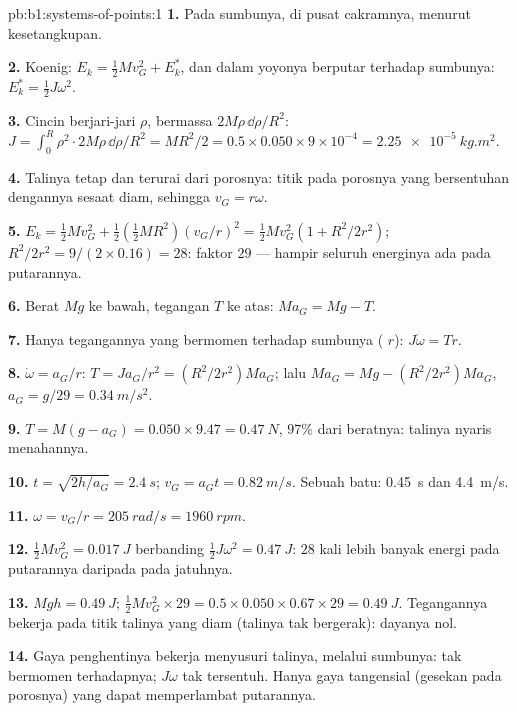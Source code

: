 \begin{solution}{pb:b1:systems-of-points:1}
\textbf{1.} Pada sumbunya, di pusat cakramnya, menurut kesetangkupan.

\textbf{2.} Koenig: $E_k = \tfrac12 Mv_G^2 + E_k^*$, dan dalam  yoyonya berputar terhadap sumbunya: $E_k^* = \tfrac12 J\omega^2$.

\textbf{3.} Cincin berjari-jari $\rho$, bermassa $2M\rho\,\dd\rho/R^2$: $J = \int_0^R
\rho^2\cdot 2M\rho\,\dd\rho/R^2 = MR^2/2 = 0.5 \times 0.050 \times 9\times10^{-4}
= \qty{2.25e-5}{kg.m^2}$.

\textbf{4.} Talinya tetap dan terurai dari porosnya: titik pada
porosnya yang bersentuhan dengannya sesaat diam, sehingga $v_G = r\omega$.

\textbf{5.} $E_k = \tfrac12 Mv_G^2 + \tfrac12(\tfrac12 MR^2)(v_G/r)^2 = \tfrac12
Mv_G^2(1 + R^2/2r^2)$; $R^2/2r^2 = 9/(2 \times 0.16) = 28$: faktor $29$ ---
hampir seluruh energinya ada pada putarannya.

\textbf{6.} Berat $Mg$ ke bawah, tegangan $T$ ke atas: $Ma_G = Mg - T$.

\textbf{7.} Hanya tegangannya yang bermomen terhadap sumbunya ( $r$):
$J\dot\omega = Tr$.

\textbf{8.} $\dot\omega = a_G/r$: $T = Ja_G/r^2 = (R^2/2r^2)Ma_G$; lalu
$Ma_G = Mg - (R^2/2r^2)Ma_G$, $a_G = g/29 = \qty{0.34}{m/s^2}$.

\textbf{9.} $T = M(g - a_G) = 0.050 \times 9.47 = \qty{0.47}{N}$, $97\%$ dari
beratnya: talinya nyaris menahannya.

\textbf{10.} $t = \sqrt{2h/a_G} = \qty{2.4}{s}$; $v_G = a_Gt = \qty{0.82}{m/s}$.
Sebuah batu: \qty{0.45}{s} dan \qty{4.4}{m/s}.

\textbf{11.} $\omega = v_G/r = \qty{205}{rad/s} = \qty{1960}{rpm}$.

\textbf{12.} $\tfrac12 Mv_G^2 = \qty{0.017}{J}$ berbanding $\tfrac12 J\omega^2 =
\qty{0.47}{J}$: $28$ kali lebih banyak energi pada putarannya daripada pada jatuhnya.

\textbf{13.} $Mgh = \qty{0.49}{J}$; $\tfrac12 Mv_G^2 \times 29 = 0.5 \times 0.050
\times 0.67 \times 29 = \qty{0.49}{J}$. Tegangannya bekerja pada titik
talinya yang diam (talinya tak bergerak): dayanya nol.

\textbf{14.} Gaya penghentinya bekerja menyusuri talinya, melalui sumbunya:
tak bermomen terhadapnya;  $J\omega$ tak tersentuh. Hanya gaya
tangensial (gesekan pada porosnya) yang dapat memperlambat putarannya.


\end{solution}
